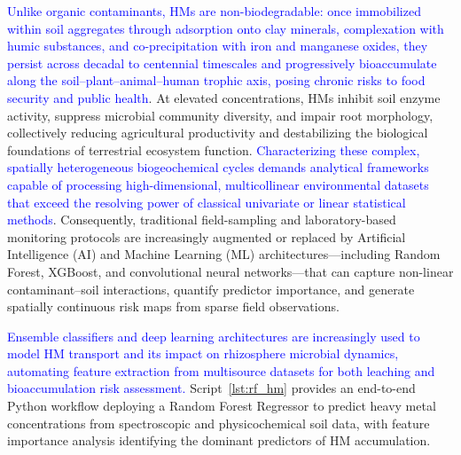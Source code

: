 \documentclass[environments,article,submit,pdftex,moreauthors]{Definitions/mdpi}
\begin{document}
\textcolor{blue}{Unlike organic contaminants, HMs are non-biodegradable: once immobilized within soil aggregates through adsorption onto clay minerals, complexation with humic substances, and co-precipitation with iron and manganese oxides, they persist across decadal to centennial timescales and progressively bioaccumulate along the soil--plant--animal--human trophic axis, posing chronic risks to food security and public health}. At elevated concentrations, HMs inhibit soil enzyme activity, suppress microbial community diversity, and impair root morphology, collectively reducing agricultural productivity and destabilizing the biological foundations of terrestrial ecosystem function. \textcolor{blue}{Characterizing these complex, spatially heterogeneous biogeochemical cycles demands analytical frameworks capable of processing high-dimensional, multicollinear environmental datasets that exceed the resolving power of classical univariate or linear statistical methods}. Consequently, traditional field-sampling and laboratory-based monitoring protocols are increasingly augmented or replaced by Artificial Intelligence (AI) and Machine Learning (ML) architectures---including Random Forest, XGBoost, and convolutional neural networks---that can capture non-linear contaminant--soil interactions, quantify predictor importance, and generate spatially continuous risk maps from sparse field observations.

\textcolor{blue}{Ensemble classifiers and deep learning architectures are increasingly used to model HM transport and its impact on rhizosphere microbial dynamics, automating feature extraction from multisource datasets for both leaching and bioaccumulation risk assessment.} Script~\ref{lst:rf_hm} provides an end-to-end Python workflow deploying a Random Forest Regressor to predict heavy metal concentrations from spectroscopic and physicochemical soil data, with feature importance analysis identifying the dominant predictors of HM accumulation.
\end{document}
